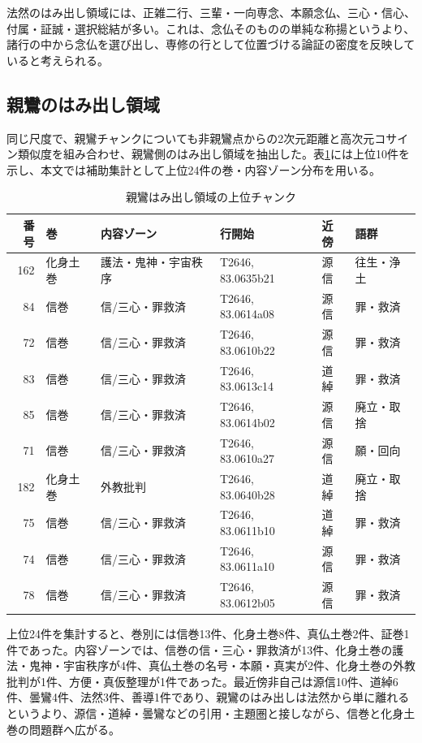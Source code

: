 \documentclass[uplatex,dvipdfmx,11pt,a4paper]{jsarticle}
\begin{document}
法然のはみ出し領域には、正雑二行、三輩・一向専念、本願念仏、三心・信心、付属・証誠・選択総結が多い。これは、念仏そのものの単純な称揚というより、諸行の中から念仏を選び出し、専修の行として位置づける論証の密度を反映していると考えられる。

\subsection{親鸞のはみ出し領域}

同じ尺度で、親鸞チャンクについても非親鸞点からの2次元距離と高次元コサイン類似度を組み合わせ、親鸞側のはみ出し領域を抽出した。表\ref{tab:shinran-protrusion}には上位10件を示し、本文では補助集計として上位24件の巻・内容ゾーン分布を用いる。

\begin{table}[H]
\centering
\small
\caption{親鸞はみ出し領域の上位チャンク}
\label{tab:shinran-protrusion}
\begin{tabular}{@{}rlllll@{}}
\toprule
番号 & 巻 & 内容ゾーン & 行開始 & 近傍 & 語群 \\
\midrule
162 & 化身土巻 & 護法・鬼神・宇宙秩序 & T2646, 83.0635b21 & 源信 & 往生・浄土 \\
84 & 信巻 & 信/三心・罪救済 & T2646, 83.0614a08 & 源信 & 罪・救済 \\
72 & 信巻 & 信/三心・罪救済 & T2646, 83.0610b22 & 源信 & 罪・救済 \\
83 & 信巻 & 信/三心・罪救済 & T2646, 83.0613c14 & 道綽 & 罪・救済 \\
85 & 信巻 & 信/三心・罪救済 & T2646, 83.0614b02 & 源信 & 廃立・取捨 \\
71 & 信巻 & 信/三心・罪救済 & T2646, 83.0610a27 & 源信 & 願・回向 \\
182 & 化身土巻 & 外教批判 & T2646, 83.0640b28 & 道綽 & 廃立・取捨 \\
75 & 信巻 & 信/三心・罪救済 & T2646, 83.0611b10 & 道綽 & 罪・救済 \\
74 & 信巻 & 信/三心・罪救済 & T2646, 83.0611a10 & 源信 & 罪・救済 \\
78 & 信巻 & 信/三心・罪救済 & T2646, 83.0612b05 & 源信 & 罪・救済 \\
\bottomrule
\end{tabular}
\end{table}

上位24件を集計すると、巻別には信巻13件、化身土巻8件、真仏土巻2件、証巻1件であった。内容ゾーンでは、信巻の信・三心・罪救済が13件、化身土巻の護法・鬼神・宇宙秩序が4件、真仏土巻の名号・本願・真実が2件、化身土巻の外教批判が1件、方便・真仮整理が1件であった。最近傍非自己は源信10件、道綽6件、曇鸞4件、法然3件、善導1件であり、親鸞のはみ出しは法然から単に離れるというより、源信・道綽・曇鸞などの引用・主題圏と接しながら、信巻と化身土巻の問題群へ広がる。
\end{document}

